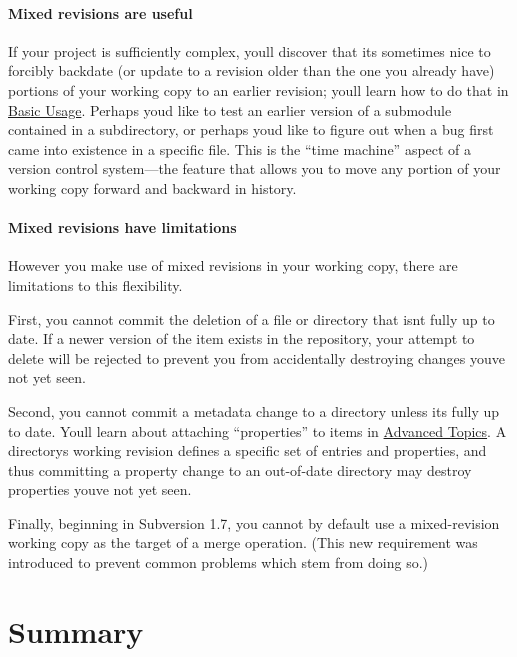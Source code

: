 \paragraph{Mixed revisions are
useful}\label{svn.basic.in-action.mixedrevs.useful}

If your project is sufficiently complex, you\textquotesingle ll discover
that it\textquotesingle s sometimes nice to forcibly backdate (or update
to a revision older than the one you already have) portions of your
working copy to an earlier revision; you\textquotesingle ll learn how to
do that in \hyperref[svn.tour]{Basic Usage}. Perhaps
you\textquotesingle d like to test an earlier version of a submodule
contained in a subdirectory, or perhaps you\textquotesingle d like to
figure out when a bug first came into existence in a specific file. This
is the ``time machine'' aspect of a version control system---the feature
that allows you to move any portion of your working copy forward and
backward in history.

\paragraph{Mixed revisions have
limitations}\label{svn.basic.in-action.mixedrevs.limits}

However you make use of mixed revisions in your working copy, there are
limitations to this flexibility.

First, you cannot commit the deletion of a file or directory that
isn\textquotesingle t fully up to date. If a newer version of the item
exists in the repository, your attempt to delete will be rejected to
prevent you from accidentally destroying changes you\textquotesingle ve
not yet seen.

Second, you cannot commit a metadata change to a directory unless
it\textquotesingle s fully up to date. You\textquotesingle ll learn
about attaching ``properties'' to items in
\hyperref[svn.advanced]{Advanced Topics}. A directory\textquotesingle s
working revision defines a specific set of entries and properties, and
thus committing a property change to an out-of-date directory may
destroy properties you\textquotesingle ve not yet seen.

Finally, beginning in Subversion 1.7, you cannot by default use a
mixed-revision working copy as the target of a merge operation. (This
new requirement was introduced to prevent common problems which stem
from doing so.)

\section{Summary}\label{svn.basic.summary}

